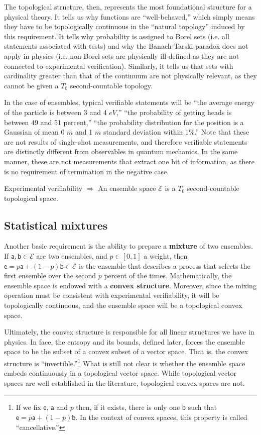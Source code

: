 \documentclass[10pt,twocolumn, nofootinbib]{revtex4-2}
\newcommand{\ens}[1][e] {\mathsf{#1}} %
\newcommand{\Ens}[1][E] {\mathcal{#1}} %
\begin{document}
The topological structure, then, represents the most foundational structure for a physical theory. It tells us why functions are ``well-behaved,'' which simply means they have to be topologically continuous in the ``natural topology'' induced by this requirement. It tells why probability is assigned to Borel sets (i.e. all statements associated with tests) and why the Banach-Tarski paradox does not apply in physics (i.e. non-Borel sets are physically ill-defined as they are not connected to experimental verification). Similarly, it tells us that sets with cardinality greater than that of the continuum are not physically relevant, as they cannot be given a $T_0$ second-countable topology.

In the case of ensembles, typical verifiable statements will be ``the average energy of the particle is between 3 and 4 $eV$,'' ``the probability of getting heads is between 49 and 51 percent,'' ``the probability distribution for the position is a Gaussian of mean 0 $m$ and 1 $m$ standard deviation within 1\%.'' Note that these are not results of single-shot measurements, and therefore verifiable statements are distinctly different from observables in quantum mechanics. In the same manner, these are not measurements that extract one bit of information, as there is no requirement of termination in the negative case.

\begin{tcolorbox}[colback=white, colframe=black]
	Experimental verifiability $\Rightarrow$ An ensemble space $\Ens$ is a $T_0$ second-countable topological space.
\end{tcolorbox}


\subsection{Statistical mixtures}
Another basic requirement is the ability to prepare a \textbf{mixture} of two ensembles. If $\ens[a], \ens[b] \in \Ens$ are two ensembles, and $p \in [0,1]$ a weight, then $\ens = p \ens[a] + (1-p) \ens[b] \in \Ens$ is the ensemble that describes a process that selects the first ensemble over the second $p$ percent of the times. Mathematically, the ensemble space is endowed with a \textbf{convex structure}. Moreover, since the mixing operation must be consistent with experimental verifiability, it will be topologically continuous, and the ensemble space will be a topological convex space.

Ultimately, the convex structure is responsible for all linear structures we have in physics. In face, the entropy and its bounds, defined later, forces the ensemble space to be the subset of a convex subset of a vector space. That is, the convex structure is ``invertible.''\footnote{If we fix $\ens$, $\ens[a]$ and $p$ then, if it exists, there is only one $\ens[b]$ such that $\ens = p \ens[a] + (1-p) \ens[b]$. In the context of convex spaces, this property is called ``cancellative.''} What is still not clear is whether the ensemble space embeds continuously in a topological vector space. While topological vector spaces are well established in the literature, topological convex spaces are not. 
\end{document}
